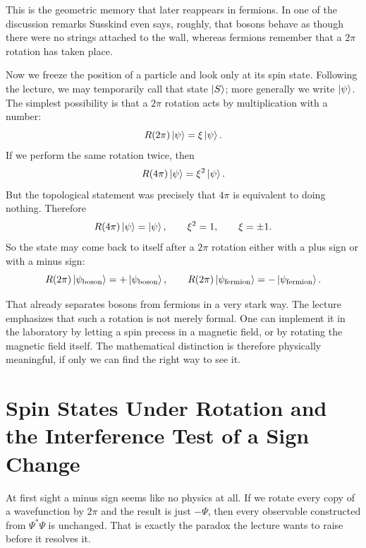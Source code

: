 This is the geometric memory that later reappears in fermions. In one of the discussion remarks Susskind even says, roughly, that bosons behave as though there were no strings attached to the wall, whereas fermions remember that a \(2\pi\) rotation has taken place.

Now we freeze the position of a particle and look only at its spin state. Following the lecture, we may temporarily call that state \(\left\lvert S\right\rangle\); more generally we write \(\left\lvert\psi\right\rangle\). The simplest possibility is that a \(2\pi\) rotation acts by multiplication with a number:
\begin{equation}
R(2\pi)\left\lvert\psi\right\rangle=\xi\left\lvert\psi\right\rangle.
\end{equation}
If we perform the same rotation twice, then
\begin{equation}
R(4\pi)\left\lvert\psi\right\rangle=\xi^2\left\lvert\psi\right\rangle.
\end{equation}
But the topological statement was precisely that \(4\pi\) is equivalent to doing nothing. Therefore
\begin{equation}
R(4\pi)\left\lvert\psi\right\rangle=\left\lvert\psi\right\rangle,
\qquad
\xi^2=1,
\qquad
\xi=\pm 1.
\end{equation}
So the state may come back to itself after a \(2\pi\) rotation either with a plus sign or with a minus sign:
\begin{equation}
R(2\pi)\left\lvert\psi_{\mathrm{boson}}\right\rangle=+\left\lvert\psi_{\mathrm{boson}}\right\rangle,
\qquad
R(2\pi)\left\lvert\psi_{\mathrm{fermion}}\right\rangle=-\left\lvert\psi_{\mathrm{fermion}}\right\rangle.
\end{equation}

That already separates bosons from fermions in a very stark way. The lecture emphasizes that such a rotation is not merely formal. One can implement it in the laboratory by letting a spin precess in a magnetic field, or by rotating the magnetic field itself. The mathematical distinction is therefore physically meaningful, if only we can find the right way to see it.

\section{Spin States Under Rotation and the Interference Test of a Sign Change}

At first sight a minus sign seems like no physics at all. If we rotate every copy of a wavefunction by \(2\pi\) and the result is just \(-\Psi\), then every observable constructed from \(\Psi^*\Psi\) is unchanged. That is exactly the paradox the lecture wants to raise before it resolves it.

